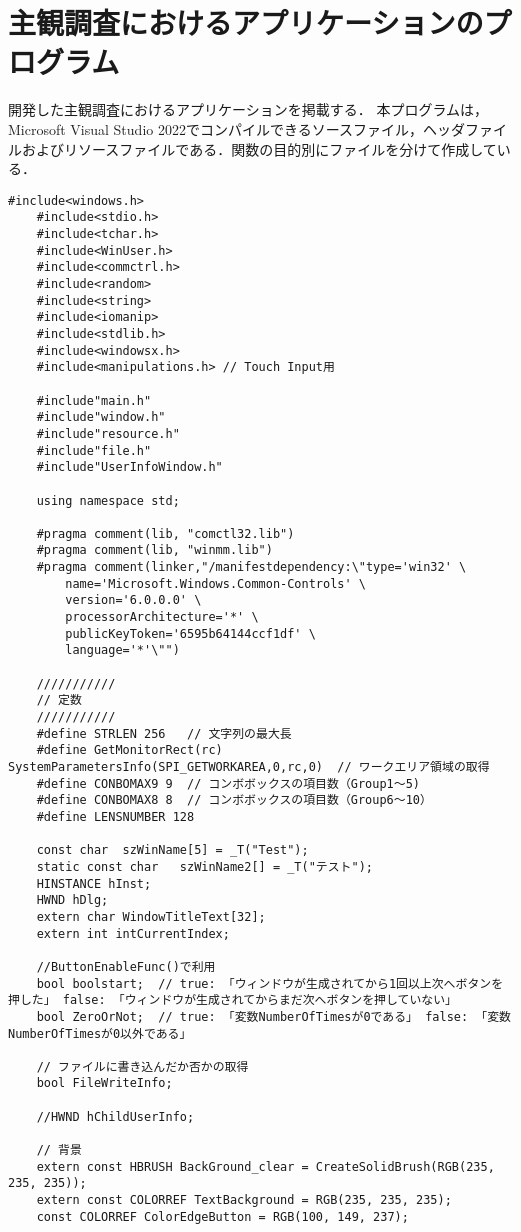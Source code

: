 \chapter{主観調査におけるアプリケーションのプログラム}
開発した主観調査におけるアプリケーションを掲載する．
本プログラムは，Microsoft Visual Studio 2022でコンパイルできるソースファイル，ヘッダファイルおよびリソースファイルである．関数の目的別にファイルを分けて作成している．

\begin{lstlisting}[caption=main.cpp]
	#include<windows.h>
	#include<stdio.h>
	#include<tchar.h>
	#include<WinUser.h>
	#include<commctrl.h> 
	#include<random>
	#include<string>
	#include<iomanip>
	#include<stdlib.h>
	#include<windowsx.h>
	#include<manipulations.h> // Touch Input用
	
	#include"main.h"
	#include"window.h"
	#include"resource.h"
	#include"file.h"
	#include"UserInfoWindow.h"
	
	using namespace std;

	#pragma comment(lib, "comctl32.lib")
	#pragma comment(lib, "winmm.lib")
	#pragma comment(linker,"/manifestdependency:\"type='win32' \
		name='Microsoft.Windows.Common-Controls' \
		version='6.0.0.0' \
		processorArchitecture='*' \
		publicKeyToken='6595b64144ccf1df' \
		language='*'\"") 
	
	///////////
	// 定数
	///////////
	#define STRLEN 256   // 文字列の最大長
	#define GetMonitorRect(rc)  SystemParametersInfo(SPI_GETWORKAREA,0,rc,0)  // ワークエリア領域の取得
	#define CONBOMAX9 9  // コンボボックスの項目数（Group1～5)
	#define CONBOMAX8 8  // コンボボックスの項目数（Group6～10）
	#define LENSNUMBER 128
	
	const char	szWinName[5] = _T("Test");
	static const char   szWinName2[] = _T("テスト");
	HINSTANCE hInst;
	HWND hDlg;
	extern char WindowTitleText[32];
	extern int intCurrentIndex;
	
	//ButtonEnableFunc()で利用
	bool boolstart;  // true: 「ウィンドウが生成されてから1回以上次へボタンを押した」 false: 「ウィンドウが生成されてからまだ次へボタンを押していない」
	bool ZeroOrNot;  // true: 「変数NumberOfTimesが0である」 false: 「変数NumberOfTimesが0以外である」
	
	// ファイルに書き込んだか否かの取得
	bool FileWriteInfo;
	
	//HWND hChildUserInfo;
	
	// 背景
	extern const HBRUSH BackGround_clear = CreateSolidBrush(RGB(235, 235, 235));
	extern const COLORREF TextBackground = RGB(235, 235, 235);
	const COLORREF ColorEdgeButton = RGB(100, 149, 237);
	

\end{lstlisting}
